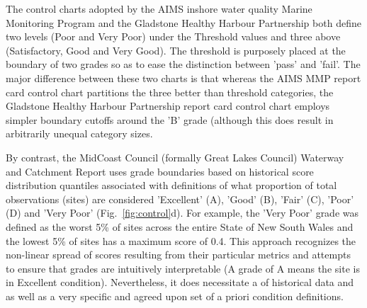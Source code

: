 The control charts adopted by the AIMS inshore water quality Marine Monitoring Program
\citep[MMP][]{Lonborg-MMP-2015} and the Gladstone Healthy Harbour Partnership \citep{GHHP-2016} both
define two levels (Poor and Very Poor) under the Threshold values and three above (Satisfactory,
Good and Very Good).  The threshold is purposely placed at the boundary of two grades so as to ease
the distinction between 'pass' and 'fail'.  The major difference between these two charts is that
whereas the AIMS MMP report card control chart partitions the three better than threshold
categories, the Gladstone Healthy Harbour Partnership report card control chart employs simpler
boundary cutoffs around the 'B' grade (although this does result in arbitrarily unequal category
sizes.

By contrast, the MidCoast Council (formally Great Lakes Council) Waterway and Catchment Report
\citep{MidCoastCouncil-2016} uses grade boundaries based on historical score distribution quantiles
associated with definitions of what proportion of total observations (sites) are considered
'Excellent' (A), 'Good' (B), 'Fair' (C), 'Poor' (D) and 'Very Poor' (Fig.~\ref{fig:control}d).  For
example, the 'Very Poor' grade was defined as the worst 5\% of sites across the entire State of New
South Wales and the lowest 5\% of sites has a maximum score of 0.4.  This approach recognizes the
non-linear spread of scores resulting from their particular metrics and attempts to ensure that
grades are intuitively interpretable (A grade of A means the site is in Excellent condition).
Nevertheless, it does necessitate a of historical data and as well as a very specific and agreed
upon set of a priori condition definitions.


